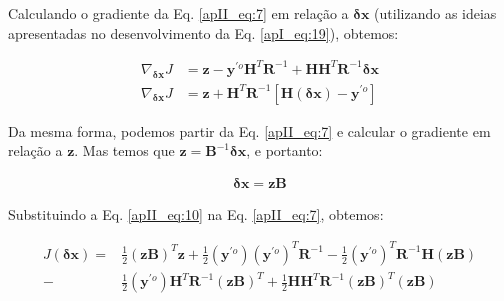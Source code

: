 Calculando o gradiente da Eq. \ref{apII_eq:7} em relação a $\mathbf{\delta{x}}$ (utilizando as ideias apresentadas no desenvolvimento da Eq. \ref{apI_eq:19}), obtemos:



\begin{align}
\label{apII_eq:8}
\nabla_{\mathbf{\delta{x}}}J & = \mathbf{z} - \mathbf{y}^{\prime{o}}\mathbf{H}^{T}\mathbf{R}^{-1} + \mathbf{H}\mathbf{H}^{T}\mathbf{R}^{-1}\mathbf{\delta{x}} \\
\label{apII_eq:9}
\nabla_{\mathbf{\delta{x}}}J & = \mathbf{z} + \mathbf{H}^{T}\mathbf{R}^{-1}[
\mathbf{H}(\mathbf{\delta{x}}) - \mathbf{y}^{\prime{o}}]
\end{align}

Da mesma forma, podemos partir da Eq. \ref{apII_eq:7} e calcular o gradiente em relação a $\mathbf{z}$. Mas temos que $\mathbf{z} = \mathbf{B}^{-1}\mathbf{\delta{x}}$, e portanto:

\begin{equation}
\label{apII_eq:10}
  \begin{split}
\mathbf{\delta{x}} = \mathbf{z}\mathbf{B}
  \end{split}
\end{equation}

Substituindo a Eq. \ref{apII_eq:10} na Eq. \ref{apII_eq:7}, obtemos:

\begin{equation}
\label{apII_eq:11}
  \begin{aligned}
J(\mathbf{\delta{x}}) = {} & \frac{1}{2}(\mathbf{z}\mathbf{B})^{T}\mathbf{z} + 
\frac{1}{2}(\mathbf{y}^{\prime{o}})(\mathbf{y}^{\prime{o}})^{T}\mathbf{R}^{-1} -
\frac{1}{2}(\mathbf{y}^{\prime{o}})^{T}\mathbf{R}^{-1}\mathbf{H}(\mathbf{z}\mathbf{B}) \\ - 
& \frac{1}{2}(\mathbf{y}^{\prime{o}})\mathbf{H}^{T}\mathbf{R}^{-1}(\mathbf{z}\mathbf{B})^{T} +
\frac{1}{2}\mathbf{H}\mathbf{H}^{T}\mathbf{R}^{-1}(\mathbf{z}\mathbf{B})^{T}(\mathbf{z}\mathbf{B})
  \end{aligned}
\end{equation}

